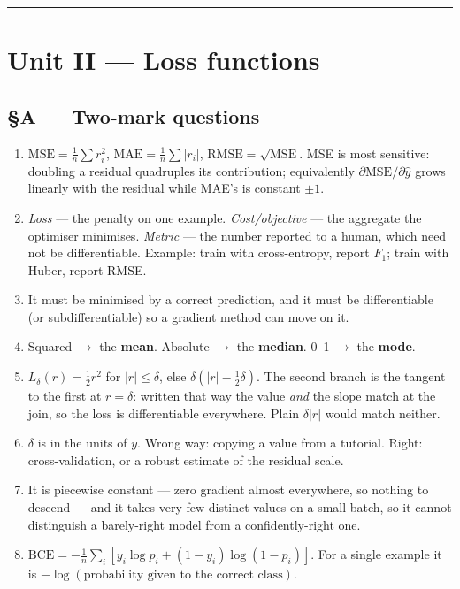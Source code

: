 \documentclass[11pt,a4paper]{article}
\newcommand{\A}[1]{\item[\textbf{#1}]}
\begin{document}
\vspace{0.4em}\hrule

\section*{Unit II --- Loss functions}

\subsection*{§A --- Two-mark questions}

\begin{enumerate}[leftmargin=1.9cm]
\A{U2.1} $\text{MSE} = \frac1n\sum r_i^2$, $\text{MAE} = \frac1n\sum|r_i|$,
$\text{RMSE} = \sqrt{\text{MSE}}$. MSE is most sensitive: doubling a residual
quadruples its contribution; equivalently $\partial\text{MSE}/\partial\hat y$
grows linearly with the residual while MAE's is constant $\pm 1$.

\A{U2.2} \emph{Loss} --- the penalty on one example. \emph{Cost/objective} ---
the aggregate the optimiser minimises. \emph{Metric} --- the number reported to
a human, which need not be differentiable. Example: train with cross-entropy,
report $F_1$; train with Huber, report RMSE.

\A{U2.3} It must be minimised by a correct prediction, and it must be
differentiable (or subdifferentiable) so a gradient method can move on it.

\A{U2.4} Squared $\to$ the \textbf{mean}. Absolute $\to$ the \textbf{median}.
0--1 $\to$ the \textbf{mode}.

\A{U2.5} $L_\delta(r) = \tfrac12 r^2$ for $|r| \le \delta$, else
$\delta(|r| - \tfrac12\delta)$. The second branch is the tangent to the first
at $r = \delta$: written that way the value \emph{and} the slope match at the
join, so the loss is differentiable everywhere. Plain $\delta|r|$ would match
neither.

\A{U2.6} $\delta$ is in the units of $y$. Wrong way: copying a value from a
tutorial. Right: cross-validation, or a robust estimate of the residual scale.

\A{U2.7} It is piecewise constant --- zero gradient almost everywhere, so
nothing to descend --- and it takes very few distinct values on a small batch,
so it cannot distinguish a barely-right model from a confidently-right one.

\A{U2.8} $\text{BCE} = -\frac1n\sum_i [y_i\log p_i + (1-y_i)\log(1-p_i)]$.
For a single example it is $-\log(\text{probability given to the correct
class})$.


\end{enumerate}
\end{document}
